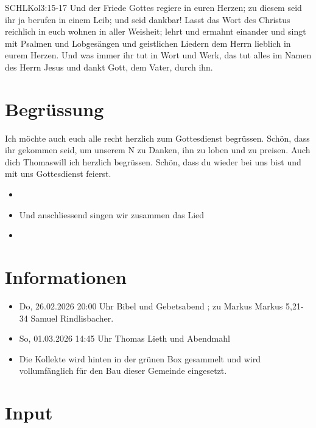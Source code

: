 \documentclass[fontsize=14pt]{../../inc/mybib}
\newcommand{\Name}{Thomas}
\begin{document}
\begin{bibelbox}{SCHL}{Kol}{3:15-17}
Und der Friede Gottes regiere in euren Herzen; zu diesem seid ihr ja berufen in einem Leib; und seid dankbar! Lasst das Wort des Christus reichlich in euch wohnen in aller Weisheit; lehrt und ermahnt einander und singt mit Psalmen und Lobgesängen und geistlichen Liedern dem Herrn lieblich in eurem Herzen. Und was immer ihr tut in Wort und Werk, das tut alles im Namen des Herrn Jesus und dankt Gott, dem Vater, durch ihn.
\end{bibelbox}
\section{Begrüssung}
Ich möchte auch euch alle recht herzlich zum Gottesdienst begrüssen. Schön, dass ihr gekommen seid, um unserem \herr N zu Danken, ihn zu loben und zu preisen.
Auch dich \Name will ich herzlich begrüssen. Schön, dass du wieder bei uns bist und mit uns Gottesdienst feierst.
\begin{itemize}
    \item[] \beten{} 
    \item[] Und anschliessend singen wir zusammen das Lied
    \item[] 
\end{itemize}

\section{Informationen}
\begin{itemize}
    \item {} Do, 26.02.2026 20:00 Uhr Bibel und Gebetsabend ; zu Markus Markus 5,21-34 Samuel Rindlisbacher.
    \item {} So, 01.03.2026 14:45 Uhr Thomas Lieth und Abendmahl
    \item {} Die Kollekte wird hinten in der grünen Box gesammelt und wird vollumfänglich für den Bau dieser Gemeinde eingesetzt.
\end{itemize}

\section{ Input }
\end{document}
